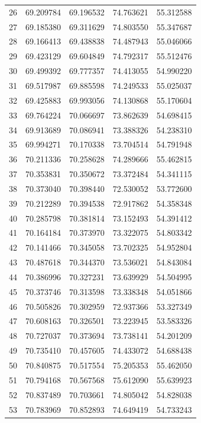\begin{table}
\begin{tabular}{rrrrr}
26 & 69.209784 & 69.196532 & 74.763621 & 55.312588 \\
27 & 69.185380 & 69.311629 & 74.803550 & 55.347687 \\
28 & 69.166413 & 69.438838 & 74.487943 & 55.046066 \\
29 & 69.423129 & 69.604849 & 74.792317 & 55.512476 \\
30 & 69.499392 & 69.777357 & 74.413055 & 54.990220 \\
31 & 69.517987 & 69.885598 & 74.249533 & 55.025037 \\
32 & 69.425883 & 69.993056 & 74.130868 & 55.170604 \\
33 & 69.764224 & 70.066697 & 73.862639 & 54.698415 \\
34 & 69.913689 & 70.086941 & 73.388326 & 54.238310 \\
35 & 69.994271 & 70.170338 & 73.704514 & 54.791948 \\
36 & 70.211336 & 70.258628 & 74.289666 & 55.462815 \\
37 & 70.353831 & 70.350672 & 73.372484 & 54.341115 \\
38 & 70.373040 & 70.398440 & 72.530052 & 53.772600 \\
39 & 70.212289 & 70.394538 & 72.917862 & 54.358348 \\
40 & 70.285798 & 70.381814 & 73.152493 & 54.391412 \\
41 & 70.164184 & 70.373970 & 73.322075 & 54.803342 \\
42 & 70.141466 & 70.345058 & 73.702325 & 54.952804 \\
43 & 70.487618 & 70.344370 & 73.536021 & 54.843084 \\
44 & 70.386996 & 70.327231 & 73.639929 & 54.504995 \\
45 & 70.373746 & 70.313598 & 73.338348 & 54.051866 \\
46 & 70.505826 & 70.302959 & 72.937366 & 53.327349 \\
47 & 70.608163 & 70.326501 & 73.223945 & 53.583326 \\
48 & 70.727037 & 70.373694 & 73.738141 & 54.201209 \\
49 & 70.735410 & 70.457605 & 74.433072 & 54.688438 \\
50 & 70.840875 & 70.517554 & 75.205353 & 55.462050 \\
51 & 70.794168 & 70.567568 & 75.612090 & 55.639923 \\
52 & 70.837489 & 70.703661 & 74.805042 & 54.828038 \\
53 & 70.783969 & 70.852893 & 74.649419 & 54.733243 \\

\end{tabular}
\end{table}
